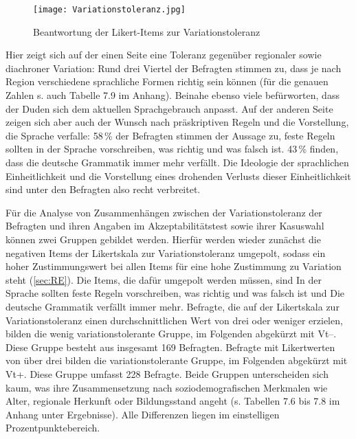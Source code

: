 \begin{figure}[htb]
\centering
\texttt{[image: Variationstoleranz.jpg]}
\caption{Beantwortung der Likert-Items zur Variationstoleranz}
\label{pic:VT}
\end{figure}

Hier zeigt sich auf der einen Seite eine Toleranz gegenüber regionaler sowie diachroner Variation: Rund drei Viertel der Befragten stimmen zu, dass je nach Region verschiedene sprachliche Formen richtig sein können (für die genauen Zahlen s. auch Tabelle 7.9 im Anhang). Beinahe ebenso viele befürworten, dass der Duden sich dem aktuellen Sprachgebrauch anpasst. 
Auf der anderen Seite zeigen sich aber auch der Wunsch nach präskriptiven Regeln und die Vorstellung, die Sprache verfalle: 58\,\% der Befragten stimmen der Aussage zu, feste Regeln sollten in der Sprache vorschreiben, was richtig und was falsch ist. 
43\,\% finden, dass die deutsche Grammatik immer mehr verfällt.
Die Ideologie der sprachlichen Einheitlichkeit und die Vorstellung eines drohenden Verlusts dieser Einheitlichkeit sind unter den Befragten also recht verbreitet. 

Für die Analyse von Zusammenhängen zwischen der Variationstoleranz der Befragten und ihren Angaben im Akzeptabilitätstest sowie ihrer Kasuswahl können zwei Gruppen gebildet werden.
Hierfür werden wieder zunächst die negativen Items der Likertskala zur Variationstoleranz umgepolt, sodass ein hoher Zustimmungswert bei allen Items für eine hohe Zustimmung zu Variation steht (\autoref{sec:RE}). 
Die Items, die dafür umgepolt werden müssen, sind \glqq In der Sprache sollten feste Regeln vorschreiben, was richtig und was falsch ist\grqq{} und \glqq Die deutsche Grammatik verfällt immer mehr\grqq.
Befragte, die auf der Likertskala zur Variationstoleranz einen durchschnittlichen Wert von drei oder weniger erzielen, bilden die wenig variationstolerante Gruppe, im Folgenden abgekürzt mit Vt--. 
Diese Gruppe besteht aus insgesamt 169 Befragten. 
Befragte mit Likertwerten von über drei bilden die variationstolerante Gruppe, im Folgenden abgekürzt mit Vt+. 
Diese Gruppe umfasst 228 Befragte. 
Beide Gruppen unterscheiden sich kaum, was ihre Zusammensetzung nach soziodemografischen Merkmalen wie Alter, regionale Herkunft oder Bildungsstand angeht (s. Tabellen 7.6 bis 7.8 im Anhang unter Ergebnisse). 
Alle Differenzen liegen im einstelligen Prozentpunktebereich. 

